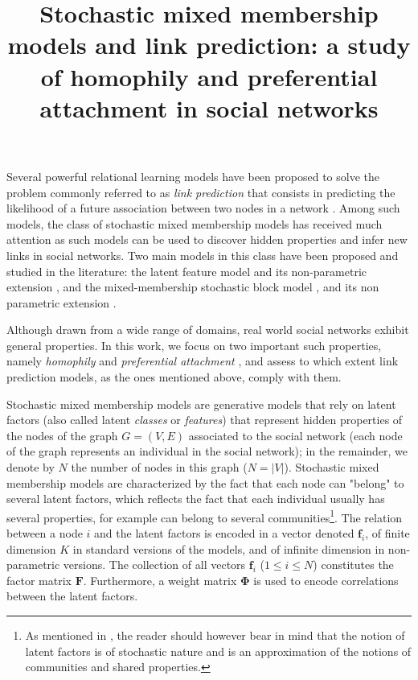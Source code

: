 \documentclass{llncs}
\title{ Stochastic mixed membership models and link prediction: a study of homophily and preferential attachment in social networks}
\newcommand{\mat}[1]{\mathbf{#1}}
\begin{document}
\maketitle

\label{sec:intro}

Several powerful relational learning models have been proposed to solve the problem commonly referred to as \textit{link prediction} that consists in predicting the likelihood of a future association between two nodes in a network \cite{LibenNowell07,HassanZaki11}. Among such models, the class of stochastic mixed membership models has received much attention as such models can be used to discover hidden properties and infer new links in social networks. Two main models in this class have been proposed and studied in the literature: the latent feature model \cite{BMF} and its non-parametric extension \cite{ILFRM}, and the mixed-membership stochastic block model \cite{MMSB}, and its non parametric extension \cite{iMMSB,diMMSB}.

Although drawn from a wide range of domains, real world social networks exhibit general properties. In this work, we focus on two important such properties, namely \textit{homophily} and \textit{preferential attachment} \cite{Newman2010,Barabasi2003}, and assess to which extent link prediction models, as the ones mentioned above, comply with them.

Stochastic mixed membership models are generative models that rely on latent factors (also called latent \textit{classes} or \textit{features}) that represent hidden properties of the nodes of the graph $G=(V,E)$ associated to the social network (each node of the graph represents an individual in the social network); in the remainder, we denote by $N$ the number of nodes in this graph ($N=|V|$). Stochastic mixed membership models are characterized by the fact that each node can "belong" to several latent factors, which reflects the fact that each individual usually has several properties, for example can belong to several communities\footnote{As mentioned in \cite{goldenberg2010survey}, the reader should however bear in mind that the notion of latent factors is of stochastic nature and is an approximation of the notions of communities and shared properties.}. The relation between a node $i$ and the latent factors is encoded in a vector denoted $\mat{f}_{i}$, of finite dimension $K$ in standard versions of the models, and of infinite dimension in  non-parametric versions. The collection of all vectors $\mat{f}_{i}$ ($1 \le i \le N$) constitutes the factor matrix $\mat{F}$. Furthermore, a weight matrix $\mat{\Phi}$ is used to encode correlations between the latent factors.
\end{document}
